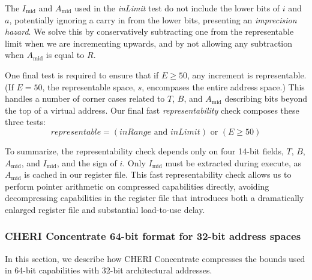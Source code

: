 The $I_\text{mid}$ and $A_\text{mid}$ used in the \emph{inLimit} test do not include the lower bits
of $i$ and $a$, potentially ignoring a carry in from the lower bits, presenting an \emph{imprecision hazard}.
We solve this by conservatively subtracting one from the representable limit
when we are incrementing upwards, and by not allowing any subtraction when $A_\text{mid}$ is equal to $R$.

One final test is required to ensure that if $E \geqslant 50$, any increment is representable.
(If $E = 50$, the representable space, $s$, encompases the entire address space.)
This handles a number of corner cases related to $T$, $B$, and $A_\text{mid}$ describing
bits beyond the top of a virtual address.
Our final fast \emph{representability} check composes these three tests:
\[ representable = (inRange  \text{~and~}  inLimit)  \text{~or~}  (E \geqslant 50)\]

To summarize, the representability check depends only on four 14-bit fields, $T$, $B$, $A_\text{mid}$,
and $I_\text{mid}$, and the sign of $i$.
Only $I_\text{mid}$ must be extracted during execute, as $A_\text{mid}$ is cached
in our register file.
This fast representability check allows us to perform pointer arithmetic on compressed capabilities directly, avoiding decompressing capabilities in the register file that introduces both a dramatically enlarged register file and substantial load-to-use delay.

\subsubsection{CHERI Concentrate 64-bit format for 32-bit address spaces}
In this section, we describe how CHERI Concentrate compresses the bounds used
in 64-bit capabilities with 32-bit architectural addresses.


